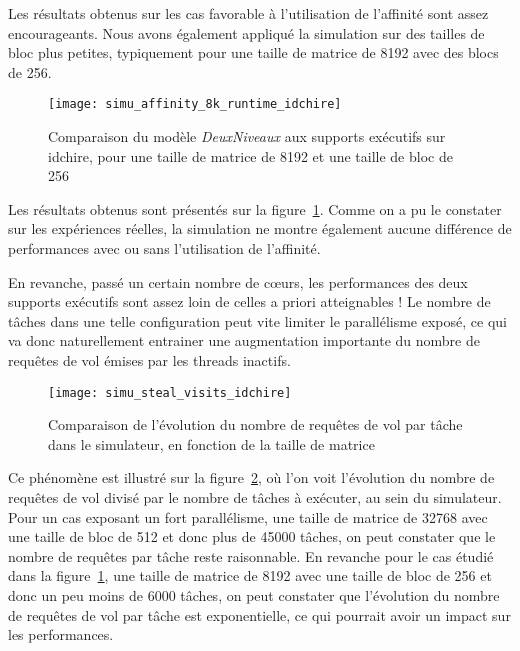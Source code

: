 Les résultats obtenus sur les cas favorable à l'utilisation de l'affinité sont assez encourageants.
Nous avons également appliqué la simulation sur des tailles de bloc plus petites, typiquement pour une taille de matrice de 8192 avec des blocs de 256.

\begin{figure}[h!]
  \centering
  \texttt{[image: simu\_affinity\_8k\_runtime\_idchire]}
  \caption{Comparaison du modèle \emph{DeuxNiveaux} aux supports exécutifs sur idchire, pour une taille de matrice de 8192 et une taille de bloc de 256}\label{fig:simu:affinityavg-8k-vs-runtime:idchire}
\end{figure}



Les résultats obtenus sont présentés sur la figure~\ref{fig:simu:affinityavg-8k-vs-runtime:idchire}.
Comme on a pu le constater sur les expériences réelles, la simulation ne montre également aucune différence de performances avec ou sans l'utilisation de l'affinité.

En revanche, passé un certain nombre de cœurs, les performances des deux supports exécutifs sont assez loin de celles a priori atteignables !
Le nombre de tâches dans une telle configuration peut vite limiter le parallélisme exposé, ce qui va donc naturellement entrainer une augmentation importante du nombre de requêtes de vol émises par les threads inactifs.

\begin{figure}[h!]
  \centering
  \texttt{[image: simu\_steal\_visits\_idchire]}
  \caption{Comparaison de l'évolution du nombre de requêtes de vol par tâche dans le simulateur, en fonction de la taille de matrice}\label{fig:simu:steals_per_task:idchire}
\end{figure}

Ce phénomène est illustré sur la figure~\ref{fig:simu:steals_per_task:idchire}, où l'on voit l'évolution du nombre de requêtes de vol divisé par le nombre de tâches à exécuter, au sein du simulateur.
Pour un cas exposant un fort parallélisme, une taille de matrice de 32768 avec une taille de bloc de 512 et donc plus de 45000 tâches, on peut constater que le nombre de requêtes par tâche reste raisonnable.
En revanche pour le cas étudié dans la figure~\ref{fig:simu:affinityavg-8k-vs-runtime:idchire}, une taille de matrice de 8192 avec une taille de bloc de 256 et donc un peu moins de 6000 tâches, on peut constater que l'évolution du nombre de requêtes de vol par tâche est exponentielle, ce qui pourrait avoir un impact sur les performances.

